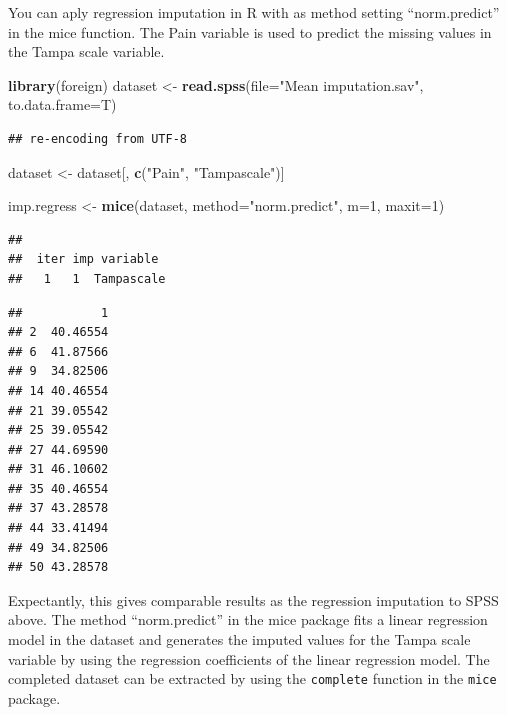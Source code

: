 \documentclass[
]{book}
\newenvironment{Shaded}{\begin{snugshade}}{\end{snugshade}}
\newcommand{\CommentTok}[1]{\textcolor[rgb]{0.56,0.35,0.01}{\textit{#1}}}
\newcommand{\DataTypeTok}[1]{\textcolor[rgb]{0.13,0.29,0.53}{#1}}
\newcommand{\DecValTok}[1]{\textcolor[rgb]{0.00,0.00,0.81}{#1}}
\newcommand{\KeywordTok}[1]{\textcolor[rgb]{0.13,0.29,0.53}{\textbf{#1}}}
\newcommand{\NormalTok}[1]{#1}
\newcommand{\OperatorTok}[1]{\textcolor[rgb]{0.81,0.36,0.00}{\textbf{#1}}}
\newcommand{\StringTok}[1]{\textcolor[rgb]{0.31,0.60,0.02}{#1}}
\begin{document}
You can aply regression imputation in R with as method setting ``norm.predict'' in the mice function. The Pain variable is used to predict the missing values in the Tampa scale variable.

\begin{Shaded}
\begin{Highlighting}[]
\KeywordTok{library}\NormalTok{(foreign)}
\NormalTok{dataset <-}\StringTok{ }\KeywordTok{read.spss}\NormalTok{(}\DataTypeTok{file=}\StringTok{"Mean imputation.sav"}\NormalTok{, }\DataTypeTok{to.data.frame=}\NormalTok{T)}
\end{Highlighting}
\end{Shaded}

\begin{verbatim}
## re-encoding from UTF-8
\end{verbatim}

\begin{Shaded}
\begin{Highlighting}[]
\NormalTok{dataset <-}\StringTok{ }\NormalTok{dataset[, }\KeywordTok{c}\NormalTok{(}\StringTok{"Pain"}\NormalTok{, }\StringTok{"Tampascale"}\NormalTok{)]}

\NormalTok{imp.regress <-}\StringTok{ }\KeywordTok{mice}\NormalTok{(dataset, }\DataTypeTok{method=}\StringTok{"norm.predict"}\NormalTok{, }\DataTypeTok{m=}\DecValTok{1}\NormalTok{, }\DataTypeTok{maxit=}\DecValTok{1}\NormalTok{)}
\end{Highlighting}
\end{Shaded}

\begin{verbatim}
## 
##  iter imp variable
##   1   1  Tampascale
\end{verbatim}

\begin{Shaded}
\end{Shaded}

\begin{verbatim}
##           1
## 2  40.46554
## 6  41.87566
## 9  34.82506
## 14 40.46554
## 21 39.05542
## 25 39.05542
## 27 44.69590
## 31 46.10602
## 35 40.46554
## 37 43.28578
## 44 33.41494
## 49 34.82506
## 50 43.28578
\end{verbatim}

Expectantly, this gives comparable results as the regression imputation to SPSS above. The method ``norm.predict'' in the mice package fits a linear regression model in the dataset and generates the imputed values for the Tampa scale variable by using the regression coefficients of the linear regression model. The completed dataset can be extracted by using the \texttt{complete} function in the \texttt{mice} package.
\end{document}
